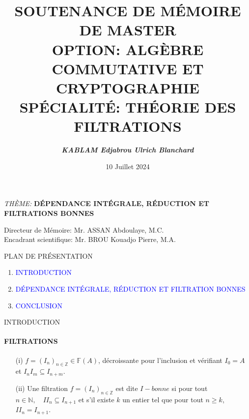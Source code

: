 \documentclass[11pt,a4paper]{beamer}
\author{\textit{\textbf{KABLAM Edjabrou Ulrich Blanchard}}}
\title{\textbf{SOUTENANCE DE MÉMOIRE DE MASTER \\ OPTION: ALGÈBRE COMMUTATIVE ET CRYPTOGRAPHIE\\ SPÉCIALITÉ: THÉORIE DES FILTRATIONS}}
\institute{\textcolor{red}{\textbf{Université NANGUI ABROGOUA \\ UFR Sciences Fondamentales Appliquées}}}
\date{10 Juillet 2024}
\begin{document}
\begin{frame}
\maketitle
\begin{block}{\begin{center}
\emph{THÈME:} \textbf{DÉPENDANCE INTÉGRALE, RÉDUCTION ET FILTRATIONS BONNES }
\end{center}}
\begin{center}
Directeur de Mémoire: Mr. ASSAN Abdoulaye, M.C. \\
Encadrant scientifique: Mr. BROU Kouadjo Pierre, M.A.
\end{center}
\end{block}
\end{frame}

\begin{frame}{
PLAN DE PRÉSENTATION}
\begin{enumerate}
\item \textcolor{blue}{INTRODUCTION}\\
\item \textcolor{blue}{DÉPENDANCE INTÉGRALE, RÉDUCTION ET FILTRATION BONNES }\\
\item \textcolor{blue}{CONCLUSION}\\
\end{enumerate}
\end{frame}

\begin{frame}{INTRODUCTION}
\framesubtitle{FILTRATIONS}
\begin{block}{}
	\begin{enumerate}
		\item[(i)]$f=(I_n)_{n \in \mathbb{Z}} \in \mathbb{F}(A)$, décroissante pour l'inclusion et vérifiant $I_0 = A$ et $I_n I_m \subseteq I_{n+m}$.
		\item[(ii)] Une filtration $f=(I_n)_{n \in \mathbb{Z}}$ est dite $I-bonne$ si pour tout $n \in \mathbb{N}, \quad II_n \subseteq I_{n+1}$ et s'il existe $k$ un entier tel que pour tout $n \geqslant k$, $II_n = I_{n+1}$.	
	\end{enumerate}
\end{block}
\end{frame}
\end{document}
